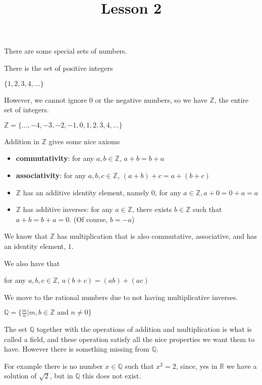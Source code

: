 \documentclass[10pt,a4paper,oneside]{book}
\title{Lesson 2}
\author{}
\date{}
\begin{document}
\maketitle

There are some special sets of numbers.

There is the set of positive integers
\begin{center}
    $\{1,2,3,4,\dots\}$
\end{center}

However, we cannot ignore $0$ or the negative numbers, so we have $\mathbb{Z}$, the entire set of integers.
\begin{center}
    $\mathbb{Z}=\{\dots,-4,-3,-2,-1,0,1,2,3,4,\dots\}$
\end{center}

Addition in $\mathbb{Z}$ gives some nice axioms
\begin{itemize}
    \item \textbf{commutativity}: for any $a,b\in \mathbb{Z}$, $a+b=b+a$
    \item \textbf{associativity}: for any $a,b,c \in \mathbb{Z}$, $(a+b)+c=a+(b+c)$
    \item $\mathbb{Z}$ has an additive identity element, namely $0$, for any $a\in \mathbb{Z}, a+0=0+a=a$
    \item $\mathbb{Z}$ has additive inverses: for any $a\in \mathbb{Z}$, there exists $b\in \mathbb{Z}$ such that $a+b=b+a=0$. (Of course, $b=-a$)
\end{itemize}

We know that $\mathbb{Z}$ has multiplication that is also commutative, associative, and has an identity element, $1$.

We also have that 
\begin{center}
    for any $a,b,c\in \mathbb{Z}$, $a(b+c)=(ab)+(ac)$
\end{center}

We move to the rational numbers due to not having multiplicative inverses.
\begin{center}
    $\mathbb{Q}=\{\frac{m}{n}|m,b\in\mathbb{Z} \text{ and } n\neq 0\}$
\end{center}

The set $\mathbb{Q}$ together with the operations of addition and multiplication is what is called a field, and these operation satisfy all the nice properties we want them to have. However there is something missing from $\mathbb{Q}$.

For example there is no number $x\in \mathbb{Q}$ such that $x^2=2$, since, yes in $\mathbb{R}$ we have a solution of $\sqrt{2}$, but in $\mathbb{Q}$ this does not exist.
\end{document}
